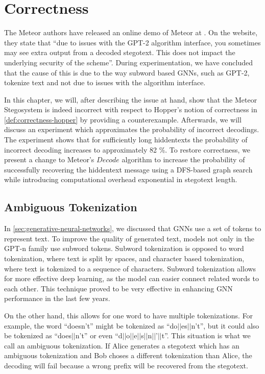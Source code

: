 \chapter{Correctness}
\label{chap:correctness}

The Meteor authors have released an online demo of Meteor at \cite{MeteorDemo2021}.
On the website, they state that ``due to issues with the GPT-2 algorithm interface, you sometimes may see extra output from a decoded stegotext. This does not impact the underlying security of the scheme''.
During experimentation, we have concluded that the cause of this is due to the way subword based GNNs, such as GPT-2, tokenize text and not due to issues with the algorithm interface.

In this chapter, we will, after describing the issue at hand, show that the Meteor Stegosystem is indeed incorrect with respect to Hopper's notion of correctness in \autoref{def:correctness-hopper} by providing a counterexample.
Afterwards, we will discuss an experiment which approximates the probability of incorrect decodings.
The experiment shows that for sufficiently long hiddentexts the probability of incorrect decoding increases to approximately 82 \%.
To restore correctness, we present a change to Meteor's $Decode$ algorithm to increase the probability of successfully recovering the hiddentext message using a DFS-based graph search while introducing computational overhead exponential in stegotext length.

\section{Ambiguous Tokenization}

In \autoref{sec:generative-neural-networks}, we discussed that GNNs use a set of tokens to represent text.
To improve the quality of generated text, models not only in the GPT-n family use subword tokens.
Subword tokenization is opposed to word tokenization, where text is split by spaces, and character based tokenization, where text is tokenized to a sequence of characters.
Subword tokenization allows for more effective deep learning, as the model can easier connect related words to each other.
This technique proved to be very effective in enhancing GNN performance in the last few years.

On the other hand, this allows for one word to have multiple tokenizations.
For example, the word ``doesn't'' might be tokenized as ``do$||$es$||$n't'', but it could also be tokenized as ``does$||$n't'' or even ``d$||$o$||$e$||$s$||$n$||$'$||$t''.
This situation is what we call an ambiguous tokenization.
If Alice generates a stegotext which has an ambiguous tokenization and Bob choses a different tokenization than Alice, the decoding will fail because a wrong prefix will be recovered from the stegotext.

